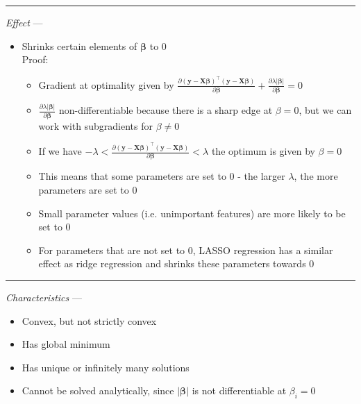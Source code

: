 {\color{lightgray}\hrule height 0.001mm}

\emph{Effect} ---
\begin{itemize}
    \item Shrinks certain elements of $\boldsymbol{\beta}$ to 0\\
    Proof:
    \begin{itemize}
        \item Gradient at optimality given by $\frac{\partial ( \boldsymbol{y} - \boldsymbol{X}\boldsymbol{\beta})^\intercal( \boldsymbol{y} - \boldsymbol{X}\boldsymbol{\beta} )}{\partial \boldsymbol{\beta}} + \frac{\partial \lambda  |\boldsymbol{\beta}|}{\partial \boldsymbol{\beta}} = 0$
        \item $\frac{\partial \lambda  |\boldsymbol{\beta}|}{\partial \boldsymbol{\beta}}$ non-differentiable because there is a sharp edge at $\beta = 0$, but we can work with subgradients for $\beta \neq 0$
        \item If we have $-\lambda < \frac{\partial ( \boldsymbol{y} - \boldsymbol{X}\boldsymbol{\beta})^\intercal( \boldsymbol{y} - \boldsymbol{X}\boldsymbol{\beta} )}{\partial \boldsymbol{\beta}} < \lambda$ the optimum is given by $\beta = 0$
        \item This means that some parameters are set to $0$ - the larger $\lambda$, the more parameters are set to $0$
        \item Small parameter values (i.e. unimportant features) are more likely to be set to $0$
        \item For parameters that are not set to $0$, LASSO regression has a similar effect as ridge regression and shrinks these parameters towards $0$
        \utem 
    \end{itemize}
\end{itemize}

{\color{lightgray}\hrule height 0.001mm}

\emph{Characteristics} --- 
\begin{itemize}
    \item Convex, but not strictly convex
    \item Has global minimum
    \item Has unique or infinitely many solutions
    \item Cannot be solved analytically, since $|\boldsymbol{\beta}|$ is not differentiable at $\beta_i = 0$
\end{itemize}